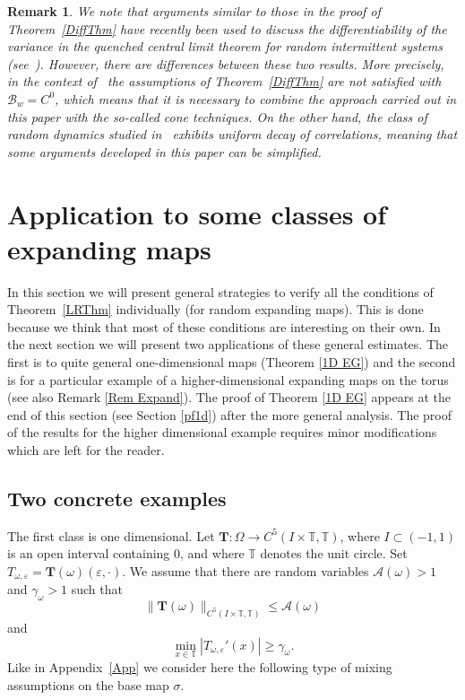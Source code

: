 \documentclass[11pt,reqno,a4paper]{article}
\theoremstyle{special}
\newtheorem{remark}[theorem]{Remark}
\def\om{\omega}
\begin{document}
\begin{remark}
We note that arguments similar to those in the proof of Theorem~\ref{DiffThm} have recently been used to discuss the differentiability of the variance in the quenched central limit theorem for random intermittent systems (see~\cite[Theorem 9]{DL}). However, there are differences between these two results.  More precisely, in the context of~\cite{DL} the assumptions of Theorem~\ref{DiffThm} are not satisfied with $\mathcal B_w=C^0$, which means that it is necessary to combine the approach carried out in this paper with the so-called cone techniques. 
On the other hand, the class of random dynamics studied in~\cite{DL} exhibits uniform decay of correlations, meaning that some  arguments developed in this paper can be simplified. 

\end{remark}


\section{Application to some classes of expanding maps}\label{Expanding}
In this section we will present general strategies to verify all the conditions of Theorem~\ref{LRThm} individually (for random expanding maps). This is done because we think that most of these conditions are interesting on their own. In the next section we will present two applications of these general estimates. The first is to quite general one-dimensional maps (Theorem \ref{1D EG}) and the second is for a particular example of a higher-dimensional expanding maps on the torus (see also Remark \ref{Rem Expand}). The proof of Theorem \ref{1D EG} appears at the end of this section (see Section \ref{pf1d}) after the more general analysis. The proof of the results for the higher dimensional example requires minor modifications which  are left for the reader.

\subsection{Two concrete examples}\label{SummSec}


The first class is one dimensional.  Let  $\mathbf T \colon \Omega \to C^5(I\times \mathbb T, \mathbb T)$, where $I\subset (-1, 1)$ is an open interval containing $0$, and where $\mathbb T$ denotes the unit circle. Set   $T_{\om, \varepsilon}=\mathbf T(\om)(\varepsilon, \cdot)$.
 We assume that there are random variables $\mathcal A(\om)>1$ and $\gamma_\om>1$ such  that 
 $$
\|\mathbf T(\om)\|_{C^5( I\times \mathbb T, \mathbb T)}\leq \mathcal A(\om)
 $$
 and 
 $$
\min_{x\in\mathbb T}|T_{\om,\varepsilon}'(x)|\geq \gamma_\om.
 $$
Like in Appendix~\ref{App} we consider here the following type of mixing assumptions on the base map $\sigma$.
\end{document}
